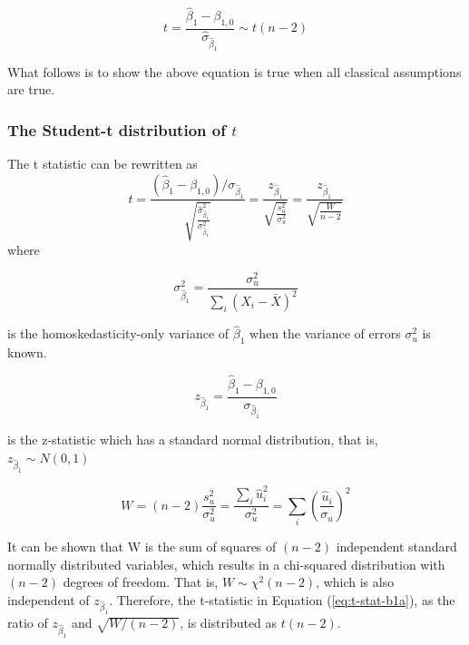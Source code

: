 \documentclass[a4paper,11pt]{article}
\begin{document}
\[ t = \frac{\hat{\beta}_1 -
\beta_{1,0}}{\hat{\sigma}_{\hat{\beta}_1}} \sim t(n-2) \]

What follows is to show the above equation is true when all classical
assumptions are true. 

\subsubsection*{The Student-t distribution of \(t\)}
\label{sec:org3f3a528}

The t statistic can be rewritten as
\begin{equation}
\label{eq:t-stat-b1a}
t = \frac{(\hat{\beta}_1 - \beta_{1,0})/\sigma_{\hat{\beta}_1}}{\sqrt{\frac{\hat{\sigma}^2_{\hat{\beta}_1}}{\sigma^2_{\hat{\beta}_1}}}} 
= \frac{z_{\hat{\beta}_1}}{\sqrt{\frac{s^2_u}{\sigma^2_u}}} = \frac{z_{\hat{\beta}_1}}{\sqrt{\frac{W}{n-2}}}
\end{equation}
where 

\[\sigma^2_{\hat{\beta}_1} = \frac{\sigma^2_u}{\sum_i (X_i -
\bar{X})^2} \] 

is the homoskedasticity-only variance of
\(\hat{\beta}_1\) when the variance of errors \(\sigma^2_u\) is known.  

\[
z_{\hat{\beta}_1} =\frac{\hat{\beta}_1 -
\beta_{1,0}}{\sigma_{\hat{\beta}_1}} 
\] 

is the z-statistic which has a standard normal distribution, that is,
\(z_{\hat{\beta}_1} \sim N(0, 1)\)

\[ 
W = (n-2)\frac{s^2_u}{\sigma^2_u} =
\frac{\sum_i\hat{u}_i^2}{\sigma^2_u} = \sum_i
\left(\frac{\hat{u}_i}{\sigma_u}\right)^2
 \] 

It can be shown that W is the sum of squares of \((n-2)\) independent
standard normally distributed variables, which results in a
chi-squared distribution with \((n-2)\) degrees of freedom. That is, \(W
\sim \chi^2(n-2)\), which is also independent of
\(z_{\hat{\beta}_1}\). Therefore, the t-statistic in Equation
(\ref{eq:t-stat-b1a}), as the ratio of \(z_{\hat{\beta}_1}\) and
\(\sqrt{W/(n-2)}\), is distributed as \(t(n-2)\).
\end{document}
